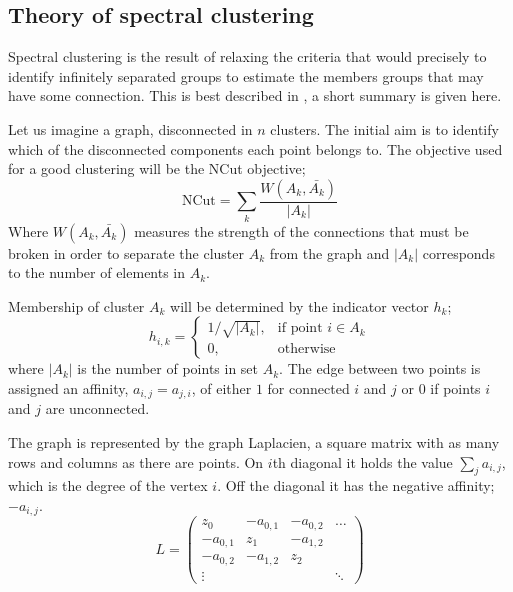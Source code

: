 \subsection{Theory of spectral clustering}\label{sec:spectral_theory}


Spectral clustering is the result of relaxing the criteria that would precisely
to identify infinitely separated groups to estimate the members  groups that may have some connection.
This is best described in \cite{luxburg2007spectraltutorial}, a short summary is given here.

Let us imagine a graph, disconnected in \(n\) clusters.
The initial aim is to identify which of the disconnected components each point belongs to.
The objective used for a good clustering will be the NCut objective;
\begin{equation}
    \text{NCut} = \sum_k\frac{W(A_k, \bar{A_k})}{|A_k|}
\end{equation}
Where \(W(A_k, \bar{A_k})\) measures the strength of the connections that must be
broken in order to separate the cluster \(A_k\) from the graph
and \(|A_k|\) corresponds to the number of elements in \(A_k\).

Membership of cluster \(A_k\) will be determined by the indicator vector \(h_k\);
\begin{equation}
    h_{i, k}= 
    \begin{cases}
        1/\sqrt{|A_k|},& \text{if point } i \in A_k \\
        0,              & \text{otherwise}
    \end{cases}
\end{equation}
where \(|A_k|\) is the number of points in set \(A_k\).
The edge between two points is assigned an affinity, \(a_{i,j} = a_{j, i}\),
of either \(1\) for connected \(i\) and \(j\) or \(0\) 
if points \(i\) and \(j\) are unconnected.

The graph is represented by the graph Laplacien, a square
matrix with as many rows and columns as there are points.
On \(i\)th diagonal it holds the value \(\sum_j a_{i, j}\),
which is the degree of the vertex \(i\).
Off the diagonal it has the negative affinity; \(-a_{i, j}\).
\begin{equation}
    L = 
    \begin{pmatrix}
        z_0 & -a_{0,1} & -a_{0,2} & \hdots \\
        -a_{0,1} & z_1 & -a_{1,2} & \\
        -a_{0,2} & -a_{1,2} & z_2 & \\
        \vdots   &          &     & \ddots 
    \end{pmatrix}
\end{equation}

